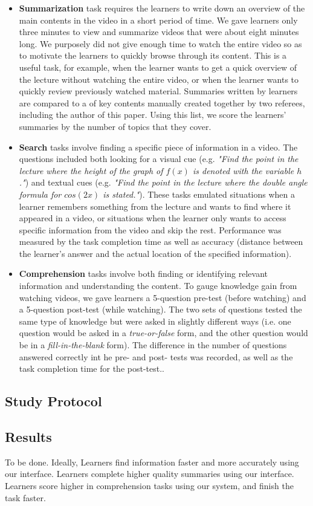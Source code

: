\begin{itemize}
\item \textbf{Summarization} task requires the learners to write down an overview of the main contents in the video in a short period of time. We gave learners only three minutes to view and summarize videos that were about eight minutes long. We purposely did not give enough time to watch the entire video so as to motivate the learners to quickly browse through its content. This is a useful task, for example, when the learner wants to get a quick overview of the lecture without watching the entire video, or when the learner wants to quickly review previously watched material. 
Summaries written by learners are compared to a  of key contents manually created together by two referees, including the author of this paper. Using this list, we score the learners' summaries by the number of topics that they cover.
\item \textbf{Search} tasks involve finding a specific piece of information in a video. The questions included both looking for a visual cue (e.g. \textit{"Find the point in the lecture where the height of the graph of $f(x)$ is denoted with the variable $h$."}) and textual cues (e.g. \textit{"Find the point in the lecture where the double angle formula for $cos(2x)$ is stated."}). These tasks emulated situations when a learner remembers something from the lecture and wants to find where it appeared in a video, or situations when the learner only wants to access specific information from the video and skip the rest. Performance was measured by the task completion time as well as accuracy (distance between the learner's answer and the actual location of the specified information).
\item \textbf{Comprehension} tasks involve both finding or identifying relevant information and understanding the content. To gauge knowledge gain from watching videos, we gave learners a 5-question pre-test (before watching) and a 5-question post-test (while watching). The two sets of questions tested the same type of knowledge but were asked in slightly different ways (i.e. one question
would be asked in a \textit{true-or-false} form, and the other question would be in a \textit{fill-in-the-blank} form). The difference in the number of questions answered correctly int he pre- and post- tests was recorded, as well as the task completion time for the post-test.. 
\end{itemize}

\subsection{Study Protocol}
\subsection{Results}
To be done. Ideally, Learners find information faster and more accurately using our interface. Learners complete higher quality summaries using our interface. Learners score higher in comprehension tasks using our system, and finish the task faster.
